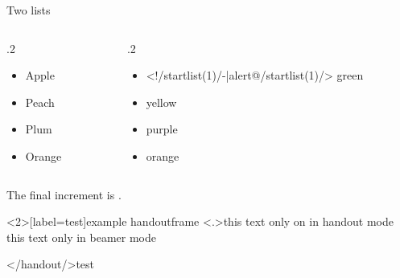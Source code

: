 \documentclass[\jobname]{beamer} %
\begin{document}
\begin{examp}
  \resetincr
  \begin{center}
    Two lists \\
  \end{center}
  \begin{columns}
    \begin{column}{.2\textwidth}
      \begin{itemize}[<+-| alert@+>]
      \item Apple \item Peach  \item Plum \item Orange
      \end{itemize}
    \end{column}
    \begin{column}{.2\textwidth}
      \begin{itemize}[<+-| alert@+>]
      \item<!/startlist(1)/-|alert@/startlist(1)/> green \item yellow \item purple \item orange
      \end{itemize}
    \end{column}
  \end{columns}
  \vfill
  \onslide<+->
  The final increment is . 
\end{examp}



\begin{examp}
  \resetincr[2]
\end{examp}

\begin{frame}<2>[label=test]{example handoutframe}
  \resetincr
  \only<.>{this text only on in handout mode\\}
  \onslide<+->
  this text only in beamer mode\\
\end{frame}

</handout/>{test}


\end{document}
